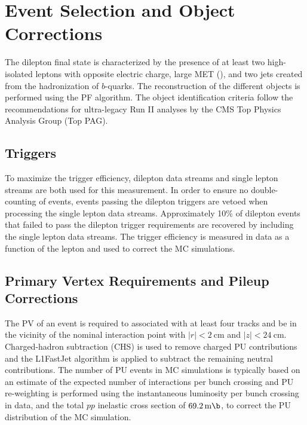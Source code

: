 \section{Event Selection and Object Corrections}
The \ttbar dilepton final state is characterized by the presence of at least two high-\pT isolated leptons with opposite electric charge, large MET (\ETmiss), and two jets created from the hadronization of $b$-quarks.
The reconstruction of the different objects is performed using the PF algorithm.
The object identification criteria follow the recommendations for ultra-legacy Run II analyses by the CMS Top Physics Analysis Group (Top PAG).

\subsection{Triggers}
To maximize the trigger efficiency, dilepton data streams and single lepton streams are both used for this measurement.
In order to ensure no double-counting of events, events passing the dilepton triggers are vetoed when processing the single lepton data streams.
Approximately 10\% of dilepton events that failed to pass the dilepton trigger requirements are recovered by including the single lepton data streams.
The trigger efficiency is measured in data as a function of the lepton \pT and used to correct the MC simulations.

\subsection{Primary Vertex Requirements and Pileup Corrections}
The PV of an event is required to associated with at least four tracks and be in the vicinity of the nominal interaction point with $\vert r \vert < \SI{2}{\cm}$ and $\vert z \vert < \SI{24}{\cm}$. 
Charged-hadron subtraction (CHS) is used to remove charged PU contributions and the L1FastJet algorithm is applied to subtract the remaining neutral contributions.
The number of PU events in MC simulations is typically based on an estimate of the expected number of interactions per bunch crossing and PU re-weighting is performed using the instantaneous luminosity per bunch crossing in data, and the total $pp$ inelastic cross section of $\SI{69.2}{\m \b}$, to correct the PU distribution of the MC simulation.

